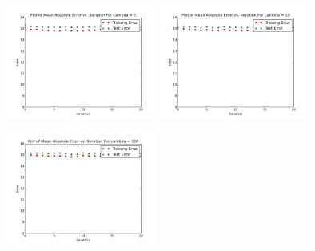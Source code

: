 \documentclass[10.5pt]{article}
\newcommand{\factwidth}{0.44}
\newcommand{\factheight}{1.6in}
\begin{document}
\begin{figure}[H]
\centering
\includegraphics[width=0\factwidth\textwidth,height=\factheight]{matrix_plots/test-i40d1l0.png}
\includegraphics[width=0\factwidth\textwidth,height=\factheight]{matrix_plots/test-i40d1l10.png}
\includegraphics[width=0\factwidth\textwidth,height=\factheight]{matrix_plots/test-i40d1l100.png}

\end{figure}
\end{document}
